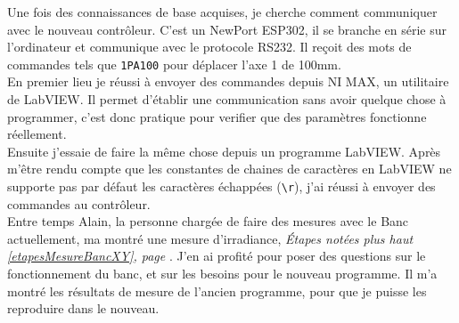 \documentclass[12pt]{article}
\begin{document}
Une fois des connaissances de base acquises, je cherche comment communiquer avec le nouveau contrôleur.
C'est un NewPort ESP302, il se branche en série sur l'ordinateur et communique avec le protocole RS232.
Il reçoit des mots de commandes tels que \verb|1PA100| pour déplacer l'axe 1 de 100mm.\\
En premier lieu je réussi à envoyer des commandes depuis NI MAX, un utilitaire de LabVIEW.
Il permet d'établir une communication sans avoir quelque chose à programmer, c'est donc pratique pour verifier que des paramètres fonctionne réellement.\\
Ensuite j'essaie de faire la même chose depuis un programme LabVIEW.
Après m'être rendu compte que les constantes de chaines de caractères en LabVIEW ne supporte pas par défaut les caractères échappées (\texttt{\textbackslash r}), j'ai réussi à envoyer des commandes au contrôleur.\\
Entre temps Alain, la personne chargée de faire des mesures avec le Banc actuellement, ma montré une mesure d'irradiance, \textit{Étapes notées plus haut \ref{etapesMesureBancXY}, page \pageref{etapesMesureBancXY}}.
J'en ai profité pour poser des questions sur le fonctionnement du banc, et sur les besoins pour le nouveau programme.
Il m'a montré les résultats de mesure de l'ancien programme, pour que je puisse les reproduire dans le nouveau.
\end{document}

